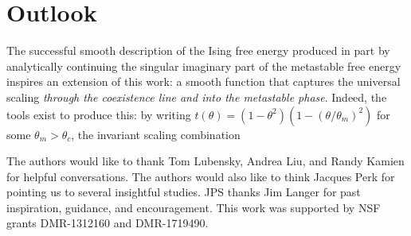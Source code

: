 \documentclass[
  aps,
  pre,
  reprint,
  longbibliography,
  floatfix
]{revtex4-2}
\begin{document}
\section{Outlook}

The successful smooth description of the Ising free energy produced in part by analytically continuing the singular imaginary part of the metastable free energy inspires an extension of this work: a smooth function that captures the universal scaling \emph{through the coexistence line and into the metastable phase}. Indeed, the tools exist to produce this: by writing $t(\theta)=(1-\theta^2)(1-(\theta/\theta_m)^2)$ for some $\theta_m>\theta_c$, the invariant scaling combination

\begin{acknowledgments}
  The authors would like to thank Tom Lubensky, Andrea Liu, and Randy Kamien
  for helpful conversations. The authors would also like to think Jacques Perk
  for pointing us to several insightful studies. JPS thanks Jim Langer for past
  inspiration, guidance, and encouragement. This work was supported by NSF
  grants DMR-1312160 and DMR-1719490.
\end{acknowledgments}


\end{document}

